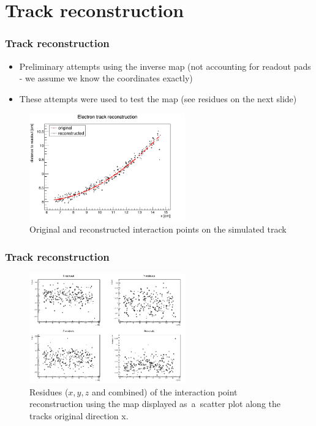\documentclass{beamer}
\begin{document}
	\section{Track reconstruction}
	\begin{frame}
		\frametitle{Track reconstruction}
		\begin{itemize}
			\item Preliminary attempts using the inverse map (not accounting for readout pads - we assume we know the coordinates exactly)
			\item These attempts were used to test the map (see residues on the next slide)
		\end{itemize}
		\begin{figure}
			\centering
			\includegraphics[width=0.6\textwidth]{../images/reco_track.png}
			\caption{Original and reconstructed interaction points on the simulated track}
		\end{figure}
	\end{frame}
	\begin{frame}
		\frametitle{Track reconstruction}
		\begin{figure}
			\centering
			\includegraphics[width=0.6\textwidth]{../images/residues_scatter.png}
			\caption{Residues ($x,y,z$ and combined) of the interaction point reconstruction using the map displayed as~a~scatter plot along the tracks original direction x.}
		\end{figure}
	\end{frame}
\end{document}
